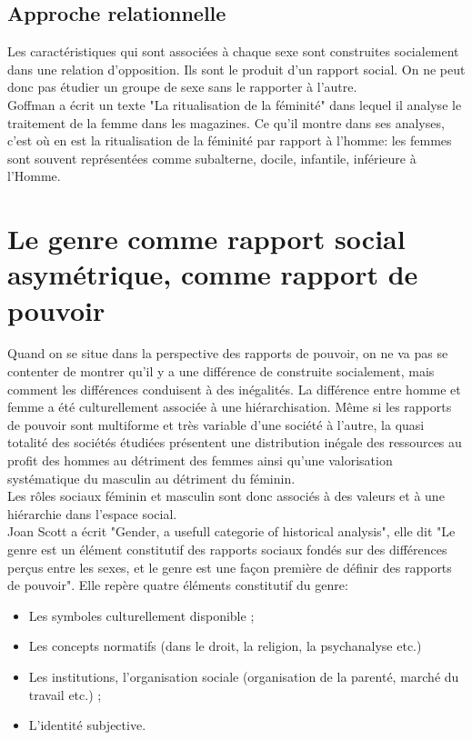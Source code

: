 \documentclass[10pt, a4paper, openany]{book}
\begin{document}
\subsection{Approche relationnelle}

Les caractéristiques qui sont associées à chaque sexe sont construites socialement dans une relation d'opposition. Ils sont le produit d'un rapport social. On ne peut donc pas étudier un groupe de sexe sans le rapporter à l'autre. \\
Goffman a écrit un texte "La ritualisation de la féminité" dans lequel il analyse le traitement de la femme dans les magazines. Ce qu'il montre dans ses analyses, c'est où en est la ritualisation de la féminité par rapport à l'homme: les femmes sont souvent représentées comme subalterne, docile, infantile, inférieure à l'Homme.

\section{Le genre comme rapport social asymétrique, comme rapport de pouvoir}

Quand on se situe dans la perspective des rapports de pouvoir, on ne va pas se contenter de montrer qu'il y a une différence de construite socialement, mais comment les différences conduisent à des inégalités. La différence entre homme et femme a été culturellement associée à une hiérarchisation. Même si les rapports de pouvoir sont multiforme et très variable d'une société à l'autre, la quasi totalité des sociétés étudiées présentent une distribution inégale des ressources au profit des hommes au détriment des femmes ainsi qu'une valorisation systématique du masculin au détriment du féminin. \\
Les rôles sociaux féminin et masculin sont donc associés à des valeurs et à une hiérarchie dans l'espace social. \\
Joan Scott a écrit "Gender, a usefull categorie of historical analysis", elle dit "Le genre est un élément constitutif des rapports sociaux fondés sur des différences perçus entre les sexes, et le genre est une façon première de définir des rapports de pouvoir". Elle repère quatre éléments constitutif du genre:
\begin{itemize}
\item Les symboles culturellement disponible ;
\item Les concepts normatifs (dans le droit, la religion, la psychanalyse etc.)
\item Les institutions, l'organisation sociale (organisation de la parenté, marché du travail etc.) ;
\item L'identité subjective. 
\end{itemize}
\end{document}
